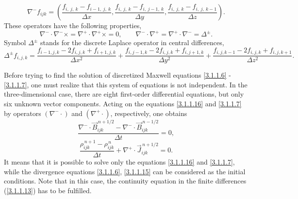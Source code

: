 \begin{equation}
\label{3.1.1.9}
\nabla^{-} f_{i j k} = \left(\frac{f_{i,\: j,\: k} - f_{i - 1,\: j,\: k}}{\Delta x}, \frac{f_{i,\: j,\: k} - f_{i,\: j - 1,\: k}}{\Delta y}, \frac{f_{i,\: j,\: k} - f_{i,\: j,\: k - 1}}{\Delta z} \right).
\end{equation}
These operators have the following properties,
\begin{equation}
\label{3.1.1.10}
\nabla^{-} \cdot \nabla^{-} \times = \nabla^{+} \cdot \nabla^{+} \times = 0, \qquad \nabla^{-} \cdot \nabla^{+} = \nabla^{+} \cdot \nabla^{-} = \Delta^{\pm}.
\end{equation}
Symbol $ \Delta^{\pm} $ stands for the discrete Laplace operator in central differences,
\begin{equation}
\label{3.1.1.11}
\Delta^{\pm} f_{i, j, k} = \frac{f_{i - 1, j, k} - 2 f_{i, j, k} + f_{i + 1, j, k}}{\Delta x^{2}} + \frac{f_{i, j - 1, k} - 2 f_{i, j, k} + f_{i, j + 1, k}}{\Delta y^{2}} + \frac{f_{i, j, k - 1} - 2 f_{i, j, k} + f_{i, j, k + 1}}{\Delta z^{2}}.
\end{equation}

Before trying to find the solution of discretized Maxwell equations \ref{3.1.1.6} - \ref{3.1.1.7}, one must realize that this system of equations is not independent. In the three-dimensional case, there are eight first-order differential equations, but only six unknown vector components. Acting on the equations \ref{3.1.1.16} and \ref{3.1.1.7} by operators $ \left(\nabla^{-}\cdot\right) $ and $ \left(\nabla^{+}\cdot\right) $, respectively, one obtains
\begin{equation}
\label{3.1.1.12}
\frac{\nabla^{-} \cdot \vec{B}_{ijk}^{\,n + 1/2} - \nabla^{-} \cdot \vec{B}_{ijk}^{\,n - 1/2}}{\Delta t} = 0,
\end{equation}
\begin{equation}
\label{3.1.1.13}
\frac{\rho_{ijk}^{\,n + 1} - \rho_{ijk}^{\,n}}{\Delta t} + \nabla^{+} \cdot \vec{J}_{ijk}^{\,n + 1/2} = 0.
\end{equation}
It means that it is possible to solve only the equations \ref{3.1.1.16} and \ref{3.1.1.7}, while the divergence equations \ref{3.1.1.6}, \ref{3.1.1.15} can be considered as the initial conditions. Note that in this case, the continuity equation in the finite differences (\ref{3.1.1.13}) has to be fulfilled.